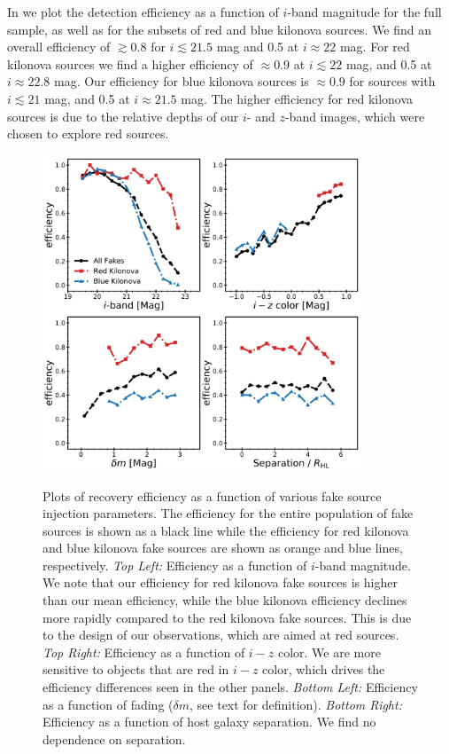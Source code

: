In  we plot the detection efficiency as a function of $i$-band magnitude for the full sample, as well as for the subsets of red and blue kilonova sources. We find an overall efficiency of $\gtrsim0.8$ for $i \lesssim 21.5$ mag and 0.5 at $i \approx 22$ mag. For red kilonova sources we find a higher efficiency of $\approx 0.9$ at $i\lesssim 22$ mag, and 0.5 at $i\approx 22.8$ mag. Our efficiency for blue kilonova sources is $\approx 0.9$ for sources with $i\lesssim 21$ mag, and 0.5 at $i\approx 21.5$ mag. The higher efficiency for red kilonova sources is due to the relative depths of our $i$- and $z$-band images, which were chosen to explore red sources.

\begin{figure}[!t]
\begin{center}
\hspace*{-0.1in}
\scalebox{1.}
{\includegraphics[width=0.85\textwidth]{./figs/chapter3/f6.pdf}}
\caption{\singlespace \singlespace Plots of recovery efficiency as a function of various fake source injection parameters. The efficiency for the entire population of fake sources is shown as a black line while the efficiency for red kilonova and blue kilonova fake sources are shown as orange and blue lines, respectively. {\it Top Left:} Efficiency as a function of $i$-band magnitude. We note that our efficiency for red kilonova fake sources is higher than our mean efficiency, while the blue kilonova efficiency declines more rapidly compared to the red kilonova fake sources. This is due to the design of our observations, which are aimed at red sources. {\it Top Right:} Efficiency as a function of $i-z$ color. We are more sensitive to objects that are red in $i-z$ color, which drives the efficiency differences seen in the other panels. {\it Bottom Left:} Efficiency as a function of fading ($\delta m$, see text for definition). {\it Bottom Right:} Efficiency as a function of host galaxy separation. We find no dependence on separation.}
\label{fig:ch3_eff_1D}
\end{center}
\end{figure}

